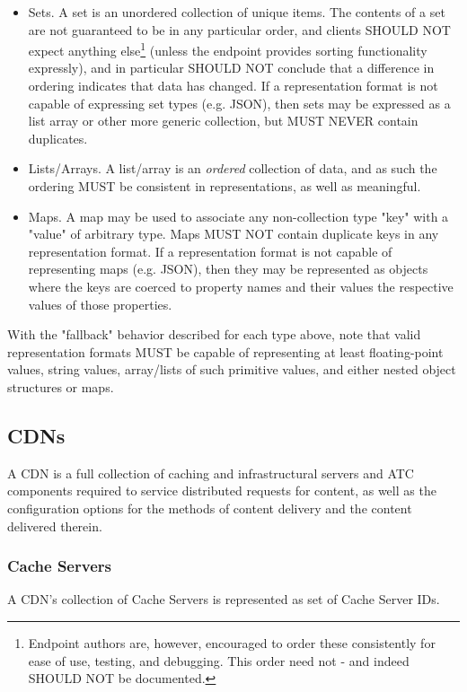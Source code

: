 \begin{itemize}
	\begin{itemize}
		\item Sets. A set is an unordered collection of unique items. The
		contents of a set are not guaranteed to be in any particular order, and
		clients SHOULD NOT expect anything else\footnote{Endpoint authors are,
		however, encouraged to order these consistently for ease of use, testing,
		and debugging. This order need not - and indeed SHOULD NOT be documented.}
		(unless the endpoint provides sorting functionality expressly), and in
		particular SHOULD NOT conclude that a difference in ordering indicates
		that data has changed. If a representation format is not capable of
		expressing set types (e.g. JSON), then sets may be expressed as a list
		array or other more generic collection, but MUST NEVER contain duplicates.

		\item Lists/Arrays. A list/array is an \emph{ordered} collection of data,
		and as such the ordering MUST be consistent in representations, as well as
		meaningful.

		\item Maps. A map may be used to associate any non-collection type "key"
		with a "value" of arbitrary type. Maps MUST NOT contain duplicate keys in
		any representation format. If a representation format is not capable of
		representing maps (e.g. JSON), then they may be represented as objects
		where the keys are coerced to property names and their values the
		respective values of those properties.
	\end{itemize}
\end{itemize}

With the "fallback" behavior described for each type above, note that valid
representation formats MUST be capable of representing at least floating-point
values, string values, array/lists of such primitive values, and either nested
object structures or maps.

\subsection{CDNs}
A CDN is a full collection of caching and infrastructural servers and ATC
components required to service distributed requests for content, as well as the
configuration options for the methods of content delivery and the content
delivered therein.

\subsubsection{Cache Servers}
A CDN's collection of Cache Servers is represented as set of Cache Server IDs.

